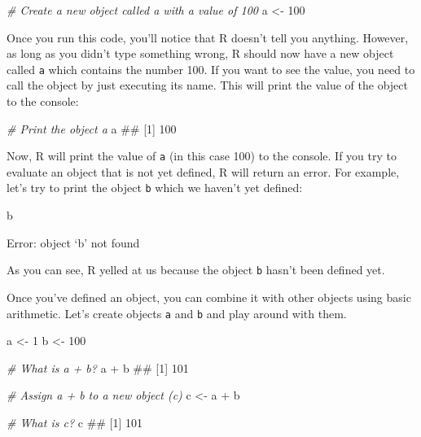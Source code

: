\documentclass[]{book}
\newenvironment{Shaded}{\begin{snugshade}}{\end{snugshade}}
\newcommand{\DecValTok}[1]{\textcolor[rgb]{0.00,0.00,0.81}{{#1}}}
\newcommand{\StringTok}[1]{\textcolor[rgb]{0.31,0.60,0.02}{{#1}}}
\newcommand{\CommentTok}[1]{\textcolor[rgb]{0.56,0.35,0.01}{\textit{{#1}}}}
\newcommand{\NormalTok}[1]{{#1}}
\theoremstyle{definition}
\theoremstyle{definition}
\theoremstyle{remark}
\begin{document}

\begin{Shaded}
\begin{Highlighting}[]
\CommentTok{# Create a new object called a with a value of 100}
\NormalTok{a <-}\StringTok{ }\DecValTok{100}
\end{Highlighting}
\end{Shaded}

Once you run this code, you'll notice that R doesn't tell you anything.
However, as long as you didn't type something wrong, R should now have a
new object called \texttt{a} which contains the number 100. If you want
to see the value, you need to call the object by just executing its
name. This will print the value of the object to the console:

\begin{Shaded}
\begin{Highlighting}[]
\CommentTok{# Print the object a}
\NormalTok{a}
\NormalTok{## [1] 100}
\end{Highlighting}
\end{Shaded}

Now, R will print the value of \texttt{a} (in this case 100) to the
console. If you try to evaluate an object that is not yet defined, R
will return an error. For example, let's try to print the object
\texttt{b} which we haven't yet defined:

\begin{Shaded}
\begin{Highlighting}[]
\NormalTok{b}
\end{Highlighting}
\end{Shaded}

Error: object `b' not found

As you can see, R yelled at us because the object \texttt{b} hasn't been
defined yet.

Once you've defined an object, you can combine it with other objects
using basic arithmetic. Let's create objects \texttt{a} and \texttt{b}
and play around with them.

\begin{Shaded}
\begin{Highlighting}[]
\NormalTok{a <-}\StringTok{ }\DecValTok{1}
\NormalTok{b <-}\StringTok{ }\DecValTok{100}

\CommentTok{# What is a + b?}
\NormalTok{a +}\StringTok{ }\NormalTok{b}
\NormalTok{## [1] 101}

\CommentTok{# Assign a + b to a new object (c)}
\NormalTok{c <-}\StringTok{ }\NormalTok{a +}\StringTok{ }\NormalTok{b}

\CommentTok{# What is c?}
\NormalTok{c}
\NormalTok{## [1] 101}
\end{Highlighting}
\end{Shaded}
\end{document}
